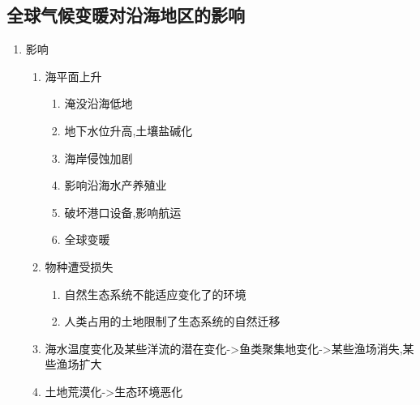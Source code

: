 \documentclass[a4paper]{article}
\begin{document}
    \subsection{全球气候变暖对沿海地区的影响}
    \begin{enumerate}
        \item 影响
        \begin{enumerate}
            \item 海平面上升
            \begin{enumerate}
                \item 淹没沿海低地
                \item 地下水位升高,土壤盐碱化
                \item 海岸侵蚀加剧
                \item 影响沿海水产养殖业
                \item 破坏港口设备,影响航运
                \item 全球变暖
            \end{enumerate}
            \item 物种遭受损失
            \begin{enumerate}
                \item 自然生态系统不能适应变化了的环境
                \item 人类占用的土地限制了生态系统的自然迁移
            \end{enumerate}
            \item 海水温度变化及某些洋流的潜在变化->鱼类聚集地变化->某些渔场消失,某些渔场扩大
            \item 土地荒漠化->生态环境恶化
        \end{enumerate}
    \end{enumerate}
\end{document}
